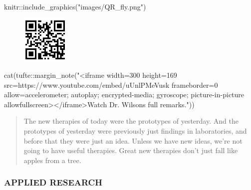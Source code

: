 \documentclass[
  letterpaper,
  DIV=11,
  numbers=noendperiod,
  oneside]{scrartcl}
\newenvironment{Shaded}{\begin{snugshade}}{\end{snugshade}}
\newcommand{\FunctionTok}[1]{\textcolor[rgb]{0.28,0.35,0.67}{#1}}
\newcommand{\NormalTok}[1]{\textcolor[rgb]{0.00,0.23,0.31}{#1}}
\newcommand{\SpecialCharTok}[1]{\textcolor[rgb]{0.37,0.37,0.37}{#1}}
\newcommand{\StringTok}[1]{\textcolor[rgb]{0.13,0.47,0.30}{#1}}
\begin{document}

\begin{Shaded}
\begin{Highlighting}[]
\NormalTok{knitr}\SpecialCharTok{::}\FunctionTok{include\_graphics}\NormalTok{(}\StringTok{"images/QR\_fly.png"}\NormalTok{)}
\end{Highlighting}
\end{Shaded}

\begin{figure}[H]

{\centering \includegraphics[width=0.2\textwidth,height=\textheight]{images/QR_fly.png}

}

\end{figure}

\begin{Shaded}
\begin{Highlighting}[]
\FunctionTok{cat}\NormalTok{(tufte}\SpecialCharTok{::}\FunctionTok{margin\_note}\NormalTok{(}\StringTok{"\textless{}iframe width=\textquotesingle{}300\textquotesingle{} height=\textquotesingle{}169\textquotesingle{} src=\textquotesingle{}https://www.youtube.com/embed/uUnlPMeVusk\textquotesingle{} frameborder=\textquotesingle{}0\textquotesingle{} allow=\textquotesingle{}accelerometer; autoplay; encrypted{-}media; gyroscope; picture{-}in{-}picture\textquotesingle{} allowfullscreen\textgreater{}\textless{}/iframe\textgreater{}Watch Dr. Wilson\textquotesingle{}s full remarks."}\NormalTok{))}
\end{Highlighting}
\end{Shaded}

\begin{quote}
The new therapies of today were the prototypes of yesterday. And the
prototypes of yesterday were previously just findings in laboratories,
and before that they were just an idea. Unless we have new ideas, we're
not going to have useful therapies. Great new therapies don't just fall
like apples from a tree.
\end{quote}

\hypertarget{applied-research}{%
\subsubsection*{APPLIED RESEARCH}\label{applied-research}}
\end{document}
